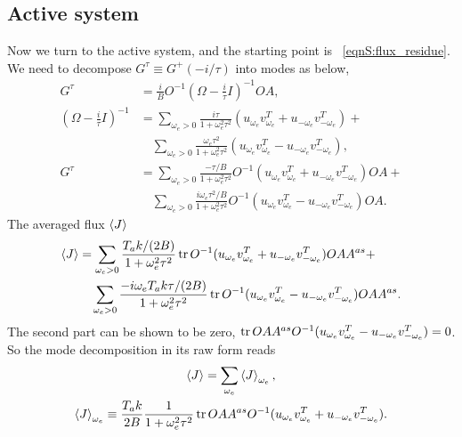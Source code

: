 \documentclass[
 amsmath,amssymb,
 aps,
 pre,
 longbibliography,
 10pt, onecolumn,
 notitlepage
]{revtex4-1}
\begin{document}
\subsection{Active system}
Now we turn to the active system, and the starting point is \eqnname~\eqref{eqnS:flux_residue}.
We need to decompose $G^\tau \equiv G^+(-i/\tau)$ into modes as below,
\begin{align}
G^\tau &= \frac{i}{B} O^{-1} (\Omega - \frac{i}{\tau}I)^{-1} OA ,\\
(\Omega - \frac{i}{\tau}I)^{-1} &=
\sum_{\omega_e > 0}\frac{i\tau}{1 + \omega_e^2 \tau^2}  (u_{\omega_e} v_{\omega_e}^T + u_{-\omega_e} v_{-\omega_e}^T) + \\
&\quad \sum_{\omega_e > 0}\frac{\omega_e\tau^2}{1 + \omega_e^2 \tau^2}  (u_{\omega_e} v_{\omega_e}^T - u_{-\omega_e} v_{-\omega_e}^T) ,\\
G^\tau &= \sum_{\omega_e > 0}\frac{-\tau/B}{1 + \omega_e^2 \tau^2} O^{-1} (u_{\omega_e} v_{\omega_e}^T + u_{-\omega_e} v_{-\omega_e}^T) OA + \\
&\quad \sum_{\omega_e > 0}\frac{i\omega_e\tau^2/B}{1 + \omega_e^2 \tau^2} O^{-1} (u_{\omega_e} v_{\omega_e}^T - u_{-\omega_e} v_{-\omega_e}^T) OA .
\end{align}
The averaged flux $\expval{J}$
\begin{equation}
\begin{split}
\expval{J} &=
\sum_{\omega_e > 0}\frac{T_ak/(2B)}{1 + \omega_e^2 \tau^2} \tr O^{-1} (u_{\omega_e} v_{\omega_e}^T + u_{-\omega_e} v_{-\omega_e}^T) OAA^{as} + \\
&\quad \sum_{\omega_e > 0}\frac{-i\omega_e T_ak\tau/(2B)}{1 + \omega_e^2 \tau^2} \tr O^{-1} (u_{\omega_e} v_{\omega_e}^T - u_{-\omega_e} v_{-\omega_e}^T) OAA^{as}.
\end{split}
\end{equation}
The second part can be shown to be zero,
$\tr OAA^{as}O^{-1} (u_{\omega_e} v_{\omega_e}^T - u_{-\omega_e} v_{-\omega_e}^T) = 0$.
So the mode decomposition in its raw form reads
\begin{gather}
\expval{J} = \sum_{\omega_e} \expval{J}_{\omega_e} ,\\
\expval{J}_{\omega_e} \equiv \frac{T_ak}{2B}\frac{1}{1 + \omega_e^2 \tau^2} \tr OAA^{as}O^{-1} (u_{\omega_e} v_{\omega_e}^T + u_{-\omega_e} v_{-\omega_e}^T). \label{eqnS:mode_J_active}
\end{gather}
\end{document}
